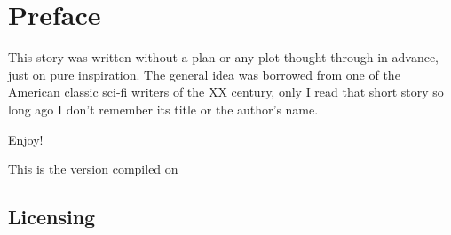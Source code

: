 \chapter*{Preface}


This story was written without a plan or any plot thought through in advance, just on pure inspiration. The general idea was borrowed from one of the American classic sci-fi writers of the XX century, only I read that short story so long ago I don't remember its title or the author's name.


Enjoy!


This is the version compiled on \DTMToday\ \DTMcurrenttime

\section*{Licensing}

\pdforepub{
	
\doclicenseThis

\hspace*{\fill} \qrcode[nolink,level=L,height=3cm]{\doclicenseURL}

}{\doclicenseLongText}